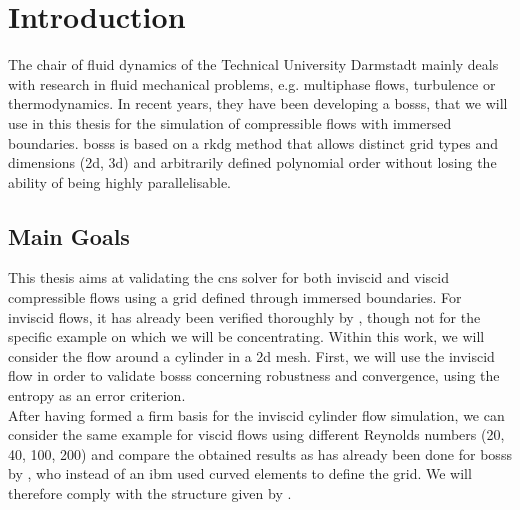 \chapter{Introduction}
The chair of fluid dynamics of the Technical University Darmstadt mainly deals with research in fluid mechanical problems, e.g. multiphase flows, turbulence or thermodynamics. In recent years, they have been developing a \acrlong{bosss}, that we will use in this thesis for the simulation of compressible flows with immersed boundaries. \gls{bosss} is based on a \gls{rkdg} method that allows  distinct grid types and dimensions (\gls{2d}, \gls{3d}) and arbitrarily defined polynomial order without losing the ability of being highly parallelisable. 

\section{Main Goals}

This thesis aims at validating the \gls{cns} solver for both inviscid and viscid compressible flows using a grid defined through immersed boundaries. For inviscid flows, it has already been verified thoroughly by \textcite{mueller2014}, though not for the specific example on which we will be concentrating. 
Within this work, we will consider the flow around a cylinder in a \gls{2d} mesh. First, we will use the inviscid flow in order to validate \gls{bosss} concerning robustness and convergence, using the entropy as an error criterion. \\ \indent
After having formed a firm basis for the inviscid cylinder flow simulation, we can consider the same example for viscid flows using different Reynolds numbers (20, 40, 100, 200) and compare the obtained results as has already been done for \gls{bosss} by \textcite{ayers}, who instead of an \gls{ibm} used curved elements to define the grid. We will therefore comply with the structure given by \textcite{ayers}.


